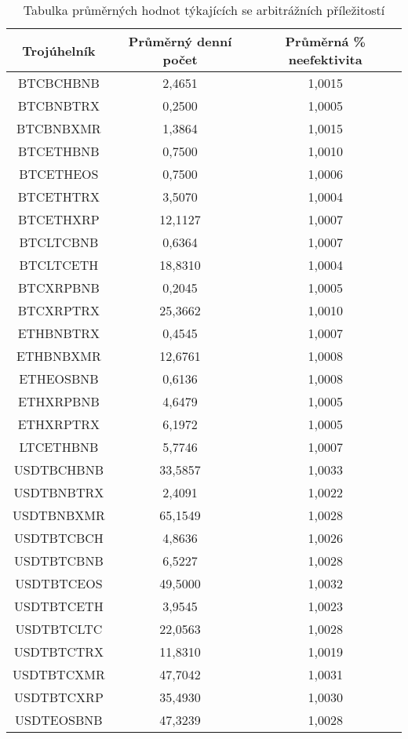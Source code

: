 \begin{table}\centering
\caption{Tabulka průměrných hodnot týkajících se arbitrážních příležitostí}
\label{table_averages}
\begin{tabular}{|| c | c | c ||}\hline Trojúhelník & Průměrný denní počet & Průměrná \% neefektivita\\ [0.5ex]
 \hline\hline BTCBCHBNB & 2,4651 & 1,0015\\ 
 \hline BTCBNBTRX & 0,2500 & 1,0005\\ 
 \hline BTCBNBXMR & 1,3864 & 1,0015\\ 
 \hline BTCETHBNB & 0,7500 & 1,0010\\ 
 \hline BTCETHEOS & 0,7500 & 1,0006\\ 
 \hline BTCETHTRX & 3,5070 & 1,0004\\ 
 \hline BTCETHXRP & 12,1127 & 1,0007\\ 
 \hline BTCLTCBNB & 0,6364 & 1,0007\\ 
 \hline BTCLTCETH & 18,8310 & 1,0004\\ 
 \hline BTCXRPBNB & 0,2045 & 1,0005\\ 
 \hline BTCXRPTRX & 25,3662 & 1,0010\\ 
 \hline ETHBNBTRX & 0,4545 & 1,0007\\ 
 \hline ETHBNBXMR & 12,6761 & 1,0008\\ 
 \hline ETHEOSBNB & 0,6136 & 1,0008\\ 
 \hline ETHXRPBNB & 4,6479 & 1,0005\\ 
 \hline ETHXRPTRX & 6,1972 & 1,0005\\ 
 \hline LTCETHBNB & 5,7746 & 1,0007\\ 
 \hline USDTBCHBNB & 33,5857 & 1,0033\\ 
 \hline USDTBNBTRX & 2,4091 & 1,0022\\ 
 \hline USDTBNBXMR & 65,1549 & 1,0028\\ 
 \hline USDTBTCBCH & 4,8636 & 1,0026\\ 
 \hline USDTBTCBNB & 6,5227 & 1,0028\\ 
 \hline USDTBTCEOS & 49,5000 & 1,0032\\ 
 \hline USDTBTCETH & 3,9545 & 1,0023\\ 
 \hline USDTBTCLTC & 22,0563 & 1,0028\\ 
 \hline USDTBTCTRX & 11,8310 & 1,0019\\ 
 \hline USDTBTCXMR & 47,7042 & 1,0031\\ 
 \hline USDTBTCXRP & 35,4930 & 1,0030\\ 
 \hline USDTEOSBNB & 47,3239 & 1,0028\\ 

\end{tabular}
\end{table}
